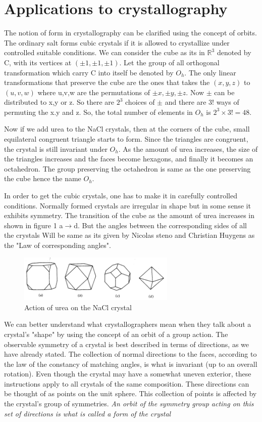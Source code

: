 \section{Applications to crystallography}
The notion of form in crystallography can be clarified using the concept of orbits. The ordinary salt forms cubic crystals if it is allowed to crystallize under controlled suitable conditions. We can consider the cube as its in $\mathbb{R}^3$ denoted by C, with its vertices at $(\pm1, \pm1,\pm1)$. Let the group of all orthogonal transformation which carry C into itself be denoted by $O_{h}$. The only linear transformations that preserve the cube are the ones that takes the $(x,y,z)$ to $(u,v,w)$ where u,v,w are the permutations of $\pm x,\pm y, \pm z$. Now $\pm$ can be distributed to x,y or z. So there are $2^3$ choices of $\pm$ and there are $3!$ ways of permuting the x.y and z. So, the total number of elements in $O_{h}$ is $2^3 \times 3!=48 $.

Now if we add urea to the NaCl crystals, then at the corners of the cube, small equilateral congruent triangle starts to form. Since the triangles are congruent, the crystal is still invariant under $O_h$. As the amount of urea increases, the size of the triangles increases and the faces become hexagons, and finally it becomes an octahedron. The group preserving the octahedron is same as the one preserving the cube hence the name $O_{h}$. 

In order to get the cubic crystals, one has to make it in carefully controlled conditions. Normally formed crystals are irregular in shape but in some sense it exhibits symmetry. The transition of the cube as the amount of urea increases in shown in figure 1 a$\longrightarrow$d. But the angles between the corresponding sides of all the crystals Will be same as its given by Nicolas steno and Christian Huygens as the "Law of corresponding angles".

\begin{figure}[H]
    \centering
    \includegraphics[width = 7.5cm]{fig1.png}
    \caption{Action of urea on the NaCl crystal~\cite{sternberg1995group}}
    \label{fig1}
\end{figure}

We can better understand what crystallographers mean when they talk about a crystal's "shape" by using the concept of an orbit of a group action. The observable symmetry of a crystal is best described in terms of directions, as we have already stated. The collection of normal directions to the faces, according to the law of the constancy of matching angles, is what is invariant (up to an overall rotation). Even though the crystal may have a somewhat uneven exterior, these instructions apply to all crystals of the same composition. These directions can be thought of as points on the unit sphere. This collection of points is affected by the crystal's group of symmetries. \textit{An orbit of the symmetry group acting on this set of directions is what is called a form of the crystal}